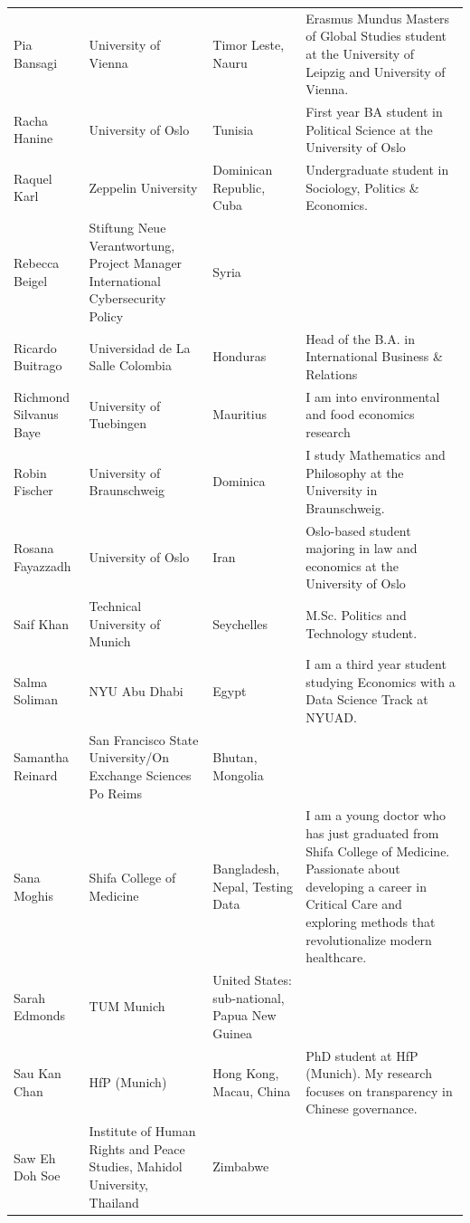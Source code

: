 \documentclass[]{article}
\begin{document}
\begin{longtable}{l>{\raggedright\arraybackslash}p{2cm}>{\raggedright\arraybackslash}p{2cm}>{\raggedright\arraybackslash}p{3cm}}
\rowcolor{gray!6}  Pia Bansagi & University of Vienna & Timor Leste, Nauru & Erasmus Mundus Masters of Global Studies student at the University of Leipzig and University of Vienna.\\
Racha Hanine & University of Oslo & Tunisia & First year BA student in Political Science at the University of Oslo\\
\addlinespace
\rowcolor{gray!6}  Raquel Karl & Zeppelin University & Dominican Republic, Cuba & Undergraduate student in Sociology, Politics \& Economics.\\
Rebecca Beigel & Stiftung Neue Verantwortung, Project Manager International Cybersecurity Policy & Syria & \\
\rowcolor{gray!6}  Ricardo Buitrago & Universidad de La Salle Colombia & Honduras & Head of the B.A. in International Business \& Relations\\
Richmond Silvanus Baye & University of Tuebingen & Mauritius & I am into environmental and food economics research\\
\rowcolor{gray!6}  Robin Fischer & University of Braunschweig & Dominica & I study Mathematics and Philosophy at the University in Braunschweig.\\
\addlinespace
Rosana Fayazzadh & University of Oslo & Iran & Oslo-based student majoring in law and economics at the University of Oslo\\
\rowcolor{gray!6}  Saif Khan & Technical University of Munich & Seychelles & M.Sc. Politics and Technology student.\\
Salma Soliman & NYU Abu Dhabi & Egypt & I am a third year student studying Economics with a Data Science Track at NYUAD.\\
\rowcolor{gray!6}  Samantha Reinard & San Francisco State University/On Exchange Sciences Po Reims & Bhutan, Mongolia & \\
Sana Moghis & Shifa College of Medicine & Bangladesh, Nepal, Testing Data & I am a young doctor who has just graduated from Shifa College of Medicine. Passionate about developing a career in Critical Care and exploring methods that revolutionalize modern healthcare.\\
\addlinespace
\rowcolor{gray!6}  Sarah Edmonds & TUM Munich & United States: sub-national, Papua New Guinea & \\
Sau Kan Chan & HfP (Munich) & Hong Kong, Macau, China & PhD student at HfP (Munich). My research focuses on transparency in Chinese governance.\\
\rowcolor{gray!6}  Saw Eh Doh Soe & Institute of Human Rights and Peace Studies, Mahidol University, Thailand & Zimbabwe & \\

\end{longtable}
\end{document}
